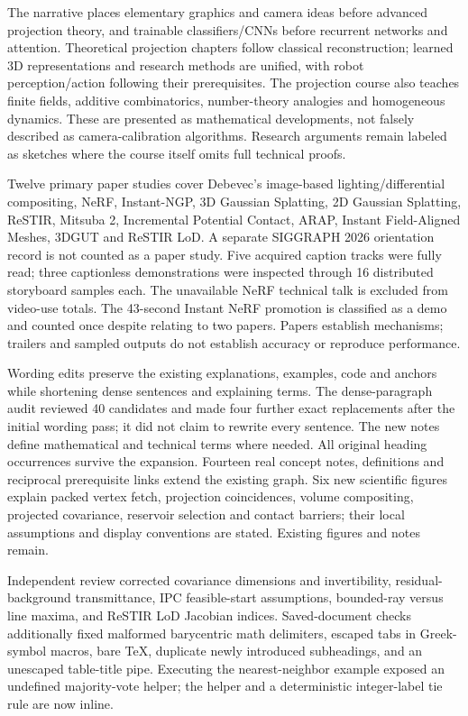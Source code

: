 The narrative places elementary graphics and camera ideas before advanced projection theory, and trainable classifiers/CNNs before recurrent networks and attention. Theoretical projection chapters follow classical reconstruction; learned 3D representations and research methods are unified, with robot perception/action following their prerequisites. The projection course also teaches finite fields, additive combinatorics, number-theory analogies and homogeneous dynamics. These are presented as mathematical developments, not falsely described as camera-calibration algorithms. Research arguments remain labeled as sketches where the course itself omits full technical proofs.

Twelve primary paper studies cover Debevec's image-based lighting/differential compositing, NeRF, Instant-NGP, 3D Gaussian Splatting, 2D Gaussian Splatting, ReSTIR, Mitsuba 2, Incremental Potential Contact, ARAP, Instant Field-Aligned Meshes, 3DGUT and ReSTIR LoD. A separate SIGGRAPH 2026 orientation record is not counted as a paper study. Five acquired caption tracks were fully read; three captionless demonstrations were inspected through 16 distributed storyboard samples each. The unavailable NeRF technical talk is excluded from video-use totals. The 43-second Instant NeRF promotion is classified as a demo and counted once despite relating to two papers. Papers establish mechanisms; trailers and sampled outputs do not establish accuracy or reproduce performance.

Wording edits preserve the existing explanations, examples, code and anchors while shortening dense sentences and explaining terms. The dense-paragraph audit reviewed 40 candidates and made four further exact replacements after the initial wording pass; it did not claim to rewrite every sentence. The new notes define mathematical and technical terms where needed. All original heading occurrences survive the expansion. Fourteen real concept notes, definitions and reciprocal prerequisite links extend the existing graph. Six new scientific figures explain packed vertex fetch, projection coincidences, volume compositing, projected covariance, reservoir selection and contact barriers; their local assumptions and display conventions are stated. Existing figures and notes remain.

Independent review corrected covariance dimensions and invertibility, residual-background transmittance, IPC feasible-start assumptions, bounded-ray versus line maxima, and ReSTIR LoD Jacobian indices. Saved-document checks additionally fixed malformed barycentric math delimiters, escaped tabs in Greek-symbol macros, bare TeX, duplicate newly introduced subheadings, and an unescaped table-title pipe. Executing the nearest-neighbor example exposed an undefined majority-vote helper; the helper and a deterministic integer-label tie rule are now inline.

